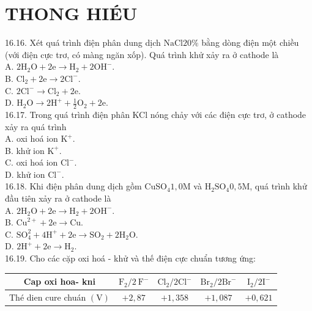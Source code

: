 \documentclass[10pt]{article}
\begin{document}
\section*{THONG HIÉU}
16.16. Xét quá trình điện phân dung dịch $\mathrm{NaCl} 20 \%$ bằng dòng điện một chiều (với điện cực trơ, có màng ngăn xốp). Quá trình khử xảy ra ở cathode là\\
A. $2 \mathrm{H}_{2} \mathrm{O}+2 \mathrm{e} \rightarrow \mathrm{H}_{2}+2 \mathrm{OH}^{-}$.\\
B. $\mathrm{Cl}_{2}+2 \mathrm{e} \rightarrow 2 \mathrm{Cl}^{-}$.\\
C. $2 \mathrm{Cl}^{-} \rightarrow \mathrm{Cl}_{2}+2 \mathrm{e}$.\\
D. $\mathrm{H}_{2} \mathrm{O} \rightarrow 2 \mathrm{H}^{+}+\frac{1}{2} \mathrm{O}_{2}+2 \mathrm{e}$.\\
16.17. Trong quá trình điện phân KCl nóng chảy với các điện cực trơ, ở cathode xảy ra quá trình\\
A. oxi hoá ion $\mathrm{K}^{+}$.\\
B. khử ion $\mathrm{K}^{+}$.\\
C. oxi hoá ion $\mathrm{Cl}^{-}$.\\
D. khử ion $\mathrm{Cl}^{-}$.\\
16.18. Khi điện phân dung dịch gồm $\mathrm{CuSO}_{4} 1,0 \mathrm{M}$ và $\mathrm{H}_{2} \mathrm{SO}_{4} 0,5 \mathrm{M}$, quá trình khử đầu tiên xảy ra ở cathode là\\
A. $2 \mathrm{H}_{2} \mathrm{O}+2 \mathrm{e} \rightarrow \mathrm{H}_{2}+2 \mathrm{OH}^{-}$.\\
B. $\mathrm{Cu}^{2+}+2 \mathrm{e} \rightarrow \mathrm{Cu}$.\\
C. $\mathrm{SO}_{4}^{2}+4 \mathrm{H}^{+}+2 \mathrm{e} \rightarrow \mathrm{SO}_{2}+2 \mathrm{H}_{2} \mathrm{O}$.\\
D. $2 \mathrm{H}^{+}+2 \mathrm{e} \rightarrow \mathrm{H}_{2}$.\\
16.19. Cho các cặp oxi hoá - khử và thế điện cực chuẩn tương ứng:

\begin{center}
\begin{tabular}{|c|c|c|c|c|}
\hline
Cap oxi hoa- kni & $\mathrm{F}_{2} / 2 \mathrm{~F}^{-}$ & $\mathrm{Cl}_{2} / 2 \mathrm{Cl}^{-}$ & $\mathrm{Br}_{2} / 2 \mathrm{Br}^{-}$ & $\mathrm{I}_{2} / 2 \mathrm{I}^{-}$ \\
\hline
Thé dien cure chuán $(\mathrm{V})$ & $+2,87$ & $+1,358$ & $+1,087$ & $+0,621$ \\
\hline
\end{tabular}
\end{center}
\end{document}
